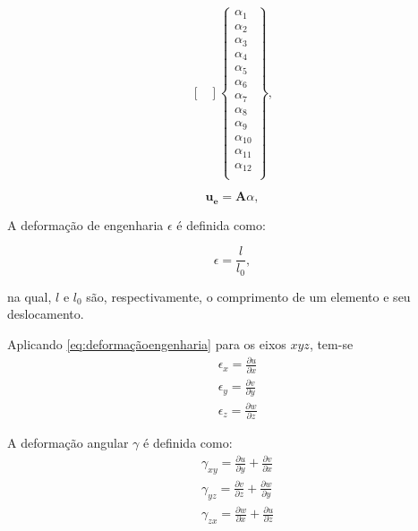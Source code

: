 \begin{equation}
\begin{bmatrix}
    \end{bmatrix}
    \begin{Bmatrix}
        \alpha_{1} \\
        \alpha_{2} \\
        \alpha_{3} \\
        \alpha_{4} \\
        \alpha_{5} \\
        \alpha_{6} \\
        \alpha_{7} \\
        \alpha_{8} \\
        \alpha_{9} \\
        \alpha_{10} \\
        \alpha_{11} \\
        \alpha_{12} \\
    \end{Bmatrix}
    ,
\end{equation}

\begin{equation} \label{eq:simplifieddisplacement}
    \pmb{u_{e}} = \pmb{A}\alpha,
\end{equation}

A deformação de engenharia $\epsilon$ é definida como:

\begin{equation} \label{eq:deformaçãoengenharia}
    \epsilon = \frac{l}{l_{0}},
\end{equation}

na qual, $l$ e $l_{0}$ são, respectivamente, o comprimento de um elemento e seu deslocamento.

Aplicando \ref{eq:deformaçãoengenharia} para os eixos $xyz$, tem-se
\begin{equation}
    \begin{gathered}
    &\epsilon_{x} = \frac{\partial u}{\partial x} \\
    &\epsilon_{y} = \frac{\partial v}{\partial y} \\
    &\epsilon_{z} = \frac{\partial w}{\partial z}
    \end{gathered}
\end{equation}

A deformação angular $\gamma$ é definida como:
\begin{equation} \label{eq:angulardef}
    \begin{gathered}
    &\gamma_{xy} = \frac{\partial u}{\partial y} + \frac{\partial v}{\partial x} \\
    &\gamma_{yz} = \frac{\partial v}{\partial z} + \frac{\partial w}{\partial y} \\
    &\gamma_{zx} = \frac{\partial w}{\partial x} + \frac{\partial u}{\partial z}
    \end{gathered}
\end{equation}

